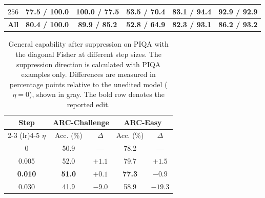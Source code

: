 \begin{table}[h]
\begin{tabular}{@{}c c c c c c@{}}
        $256$
        & 77.5 / 100.0
        & \cellcolor{gray!18} 100.0 / 77.5
        & 53.5 / 70.4
        & 83.1 / 94.4
        & 92.9 / 92.9 \\

        \midrule

        \textbf{All}
        & \textbf{80.4 / 100.0}
        & \cellcolor{gray!18} \textbf{89.9 / 85.2}
        & \textbf{52.8 / 64.9}
        & \textbf{82.3 / 93.1}
        & \textbf{86.2 / 93.2} \\
        \bottomrule
    \end{tabular}
    \label{tab:curvature-approximation}
\end{table}

\begin{table}[h]
    \caption{
        General capability after suppression on PIQA with the diagonal Fisher at different step sizes. The suppression direction is calculated with PIQA examples only. Differences are measured in percentage points relative to the unedited model ($\eta=0$), shown in gray. The bold row denotes the reported edit.
    }
    \centering
    \small
    \setlength{\tabcolsep}{7pt}
    \renewcommand{\arraystretch}{1.12}

    \begin{tabular}{@{}ccccc@{}}
        \toprule
        \textbf{Step}
        & \multicolumn{2}{c}{\textbf{ARC-Challenge}}
        & \multicolumn{2}{c}{\textbf{ARC-Easy}} \\
        \cmidrule(lr){2-3}
        \cmidrule(lr){4-5}
        $\eta$
        & Acc. (\%)
        & $\Delta$
        & Acc. (\%)
        & $\Delta$ \\
        \midrule

        \rowcolor{gray!18}
        0
        & 50.9
        & ---
        & 78.2
        & --- \\

        0.005
        & 52.0
        & $+1.1$
        & 79.7
        & $+1.5$ \\

        \textbf{0.010}
        & \textbf{51.0}
        & $\mathbf{+0.1}$
        & \textbf{77.3}
        & $\mathbf{-0.9}$ \\

        0.030
        & 41.9
        & $-9.0$
        & 58.9
        & $-19.3$ \\

        \bottomrule
    \end{tabular}
    \label{tab:piqa-capability}
\end{table}
